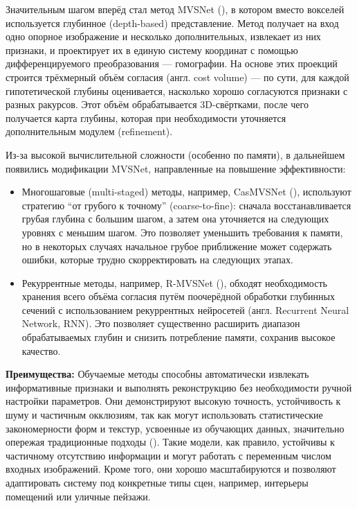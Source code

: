 Значительным шагом вперёд стал метод MVSNet
(\cite{yao2018mvsnetdepthinferenceunstructured}), в котором вместо вокселей
используется глубинное (depth-based) представление. Метод получает на вход одно
опорное изображение и несколько дополнительных, извлекает из них признаки, и
проектирует их в единую систему координат с помощью дифференцируемого
преобразования — гомографии. На основе этих проекций строится трёхмерный
объём согласия (англ. cost volume) — по сути, для каждой гипотетической глубины
оценивается, насколько хорошо согласуются признаки с разных ракурсов. Этот объём
обрабатывается 3D-свёртками, после чего получается карта глубины, которая при
необходимости уточняется дополнительным модулем (refinement).

Из-за высокой вычислительной сложности (особенно по памяти), в дальнейшем
появились модификации MVSNet, направленные на повышение эффективности:

\begin{itemize}
	\item Многошаговые (multi-staged) методы, например, CasMVSNet
	(\cite{gu2020cascadecostvolumehighresolution}), используют стратегию ``от
	грубого к точному'' (coarse-to-fine): сначала восстанавливается грубая глубина
	с большим шагом, а затем она уточняется на следующих уровнях с меньшим шагом.
	Это позволяет уменьшить требования к памяти, но в некоторых случаях начальное
	грубое приближение может содержать ошибки, которые трудно скорректировать на
	следующих этапах.
	\item Рекуррентные методы, например, R-MVSNet
	(\cite{yao2019recurrentmvsnethighresolutionmultiview}), обходят необходимость
	хранения всего объёма согласия путём поочерёдной обработки глубинных сечений с
	использованием рекуррентных нейросетей (англ. Recurrent Neural Network, RNN).
	Это позволяет существенно расширить диапазон обрабатываемых глубин и снизить
	потребление памяти, сохранив высокое качество.
\end{itemize}

\textbf{Преимущества:}
Обучаемые методы способны автоматически извлекать информативные признаки и
выполнять реконструкцию без необходимости ручной настройки параметров. Они
демонстрируют высокую точность, устойчивость к шуму и частичным окклюзиям, так
как могут использовать статистические закономерности форм и текстур, усвоенные
из обучающих данных, значительно опережая традиционные подходы
(\cite{10.1109/CVPR.2017.272}). Такие модели, как правило, устойчивы к
частичному отсутствию информации и могут работать с переменным числом входных
изображений. Кроме того, они хорошо масштабируются и позволяют адаптировать
систему под конкретные типы сцен, например, интерьеры помещений или уличные
пейзажи.

